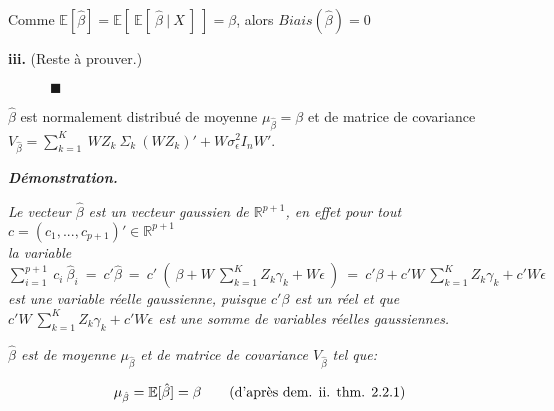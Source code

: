 \documentclass[11pt,fleqn]{book} %
\begin{document}
\vspace{0.5em}

Comme \:$\mathbb{E}[\hat{\beta}]=\mathbb{E}[\:\mathbb{E}[\:\hat{\beta}\:|\:X \:]\:]=\beta$,\: alors $Biais(\hat{\beta})=0$\\

\vspace{0.5em}


\textbf{iii.} (Reste à prouver.)


\vspace{1em}

$\quad\quad\quad \blacksquare$

\newpage

\begin{proposition}

$\hat{\beta}$ est normalement distribué de moyenne  $\mu_{\hat{\beta}}=\beta$ et de matrice de covariance $V_{\hat{\beta}}=\sum_{k=1}^{K}\: W Z_k\: \Sigma_k \:(W Z_k)'+ W\sigma_{\epsilon}^2 I_n W'$.

\end{proposition}

\vspace{0.5em}

\textit{\textbf{Démonstration.}}

\vspace{0.5em}

\textit{Le vecteur $\hat{\beta}$ est un vecteur gaussien de $\mathbb{R}^{p+1}$, en effet pour tout $c=(c_1, ... ,c_{p+1})'\in \mathbb{R}^{p+1}$\\ 
la variable\: $\sum_{i=1}^{p+1}\:c_i\:\hat{\beta}_i\:=\:c'\hat{\beta}\:=\:c'\:\left(\: \beta + W \:\sum_{k=1}^{K} Z_k \gamma_k +W\epsilon\:\right)\:=\:c'\beta+c'  W \:\sum_{k=1}^{K} Z_k \gamma_k+c'W\epsilon $\\ 
est une variable réelle gaussienne, puisque $c'\beta$ est un réel et que $c' W \:\sum_{k=1}^{K} Z_k \gamma_k+c'W\epsilon $ est une somme de variables réelles gaussiennes.}
   
\vspace{1em}

\textit{$\hat{\beta}$ est de moyenne $\mu_{\hat{\beta}}$ et de matrice de covariance $V_{\hat{\beta}}$ tel que:}

\begin{align*}
\mu_{\hat{\beta}}=\mathbb{E}[\hat{\beta}]=\beta \qquad\textnormal{(d'après dem. ii. thm. 2.2.1)}
\end{align*}
\end{document}
